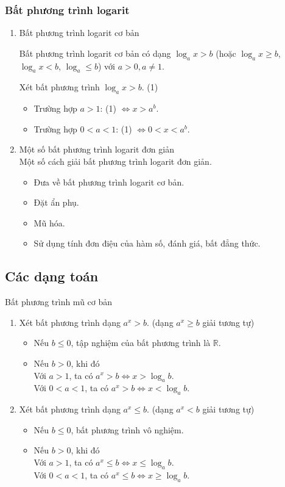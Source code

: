 \subsubsection{Bất phương trình logarit}
\begin{enumerate}
	\item Bất phương trình logarit cơ bản
	\begin{dn}
		Bất phương trình logarit cơ bản có dạng $\log_a x>b$ (hoặc $\log_a x \ge b$, $\log_a x<b$, $\log_a \le b$) với $a>0, a\ne 1$.
	\end{dn}
	Xét bất phương trình $\log_a x >b$. (1)
	\begin{itemize}
		\item Trường hợp $a>1$: (1) $\Leftrightarrow x>a^b$. 
		\item Trường hợp $0<a<1$: (1) $\Leftrightarrow 0<x<a^b$. 
	\end{itemize}
	\item Một số bất phương trình logarit đơn giản\\
	Một số cách giải bất phương trình logarit đơn giản.
	\begin{itemize}
		\item Đưa về bất phương trình logarit cơ bản.
		\item Đặt ẩn phụ.
		\item Mũ hóa.
		\item Sử dụng tính đơn điệu của hàm số, đánh giá, bất đẳng thức.
	\end{itemize}
\end{enumerate}
\subsection{Các dạng toán}
\begin{dang}{Bất phương trình mũ cơ bản}
\begin{enumerate}
	\item Xét bất phương trình dạng $a^x>b$. (dạng $a^x\ge b$ giải tương tự)
	\begin{itemize}
		\item Nếu $b\le 0$, tập nghiệm của bất phương trình là $\mathbb{R}$.
		\item Nếu $b>0$, khi đó\\
		Với $a>1$, ta có $a^x>b \Leftrightarrow x>\log_a b$.\\
		Với $0<a<1$, ta có $a^x>b \Leftrightarrow x<\log_a b$.
	\end{itemize}
	\item Xét bất phương trình dạng $a^x\le b$. (dạng $a^x< b$ giải tương tự)
	\begin{itemize}
		\item Nếu $b\le 0$, bất phương trình vô nghiệm.
		\item Nếu $b>0$, khi đó\\
		Với $a>1$, ta có $a^x\le b \Leftrightarrow x \le \log_a b$.\\
		Với $0<a<1$, ta có $a^x \le b \Leftrightarrow x \ge \log_a b$.
	\end{itemize}
\end{enumerate}
\end{dang}
\setcounter{vd}{0}
\setcounter{bt}{0}


